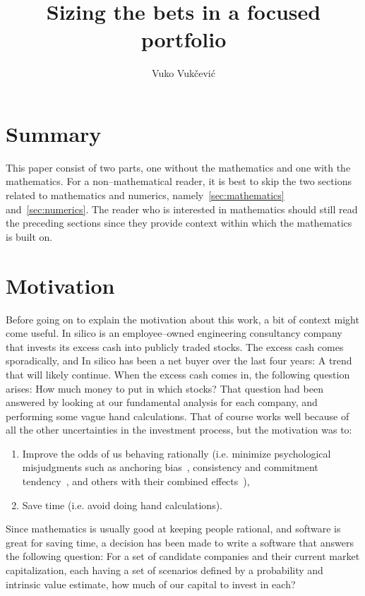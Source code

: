 \documentclass{article}
\title{Sizing the bets in a focused portfolio}
\author[$\dagger$]{Vuko Vuk\v{c}evi\'{c}}
\affil[$\dagger$]{In silico Ltd., Zagreb, Croatia, vuko.vukcevic@insilico.hr}
\begin{document}
\maketitle

\section{Summary}
\label{sec:summary}

This paper consist of two parts, one without the mathematics and one with the
mathematics. For a non--mathematical reader, it is best to skip the two sections
related to mathematics and numerics, namely~\autoref{sec:mathematics}
and~\autoref{sec:numerics}. The reader who is interested in mathematics should
still read the preceding sections since they provide context within which the
mathematics is built on.

\section{Motivation}
\label{sec:motivation}

Before going on to explain the motivation about this work, a bit of context
might come useful. In silico is an employee--owned engineering consultancy
company that invests its excess cash into publicly traded stocks. The excess
cash comes sporadically, and In silico has been a net buyer over the last four
years: A trend that will likely continue. When the excess cash comes in, the
following question arises: How much money to put in which stocks? That question
had been answered by looking at our fundamental analysis for each company, and
performing some vague hand calculations. That of course works well because of
all the other uncertainties in the investment process, but the motivation was
to:
\begin{enumerate}
    \item Improve the odds of us behaving rationally (i.e. minimize
    psychological misjudgments such as anchoring bias~\cite{kahneman},
    consistency and commitment tendency~\cite{cialdini}, and
    others with their combined effects~\cite{almanack}),
    \item Save time (i.e. avoid doing hand calculations).
\end{enumerate}

Since mathematics is usually good at keeping people rational, and software is
great for saving time, a decision has been made to write a software that answers
the following question: For a set of candidate companies and their current
market capitalization, each having a set of scenarios defined by a probability
and intrinsic value estimate, how much of our capital to invest in each?
\end{document}
